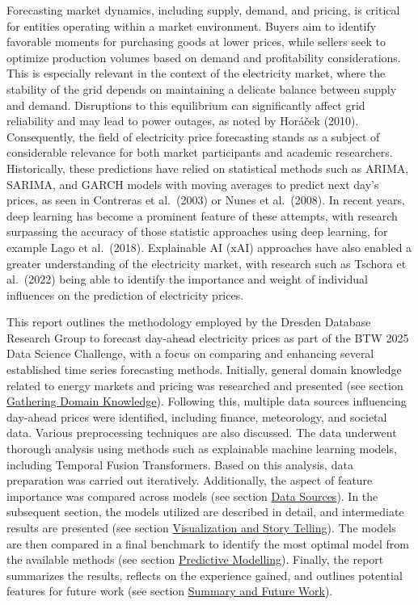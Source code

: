 \documentclass[a4paper]{article}
\begin{document}
    Forecasting market dynamics, including supply, demand, and pricing, is
critical for entities operating within a market environment. Buyers aim
to identify favorable moments for purchasing goods at lower prices,
while sellers seek to optimize production volumes based on demand and
profitability considerations. This is especially relevant in the context
of the electricity market, where the stability of the grid depends on
maintaining a delicate balance between supply and demand. Disruptions to
this equilibrium can significantly affect grid reliability and may lead
to power outages, as noted by Horáček (2010). Consequently, the field of
electricity price forecasting stands as a subject of considerable
relevance for both market participants and academic researchers.
Historically, these predictions have relied on statistical methods such
as ARIMA, SARIMA, and GARCH models with moving averages to predict next
day's prices, as seen in Contreras et al.~(2003) or Nunes et al.~(2008).
In recent years, deep learning has become a prominent feature of these
attempts, with research surpassing the accuracy of those statistic
approaches using deep learning, for example Lago et al.~(2018).
Explainable AI (xAI) approaches have also enabled a greater
understanding of the electricity market, with research such as Tschora
et al.~(2022) being able to identify the importance and weight of
individual influences on the prediction of electricity prices.

This report outlines the methodology employed by the Dresden Database
Research Group to forecast day-ahead electricity prices as part of the
BTW 2025 Data Science Challenge, with a focus on comparing and enhancing
several established time series forecasting methods. Initially, general
domain knowledge related to energy markets and pricing was researched
and presented (see section
\hyperref[gathering-domain-knowledge]{Gathering Domain Knowledge}).
Following this, multiple data sources influencing day-ahead prices were
identified, including finance, meteorology, and societal data. Various
preprocessing techniques are also discussed. The data underwent thorough
analysis using methods such as explainable machine learning models,
including Temporal Fusion Transformers. Based on this analysis, data
preparation was carried out iteratively. Additionally, the aspect of
feature importance was compared across models (see section
\hyperref[data-sources]{Data Sources}). In the subsequent section, the
models utilized are described in detail, and intermediate results are
presented (see section
\hyperref[visualization-and-story-telling]{Visualization and Story Telling}).
The models are then compared in a final benchmark to identify the most
optimal model from the available methods (see section
\hyperref[predictive-modeling]{Predictive Modelling}). Finally, the
report summarizes the results, reflects on the experience gained, and
outlines potential features for future work (see section
\hyperref[summary-and-future-work]{Summary and Future Work}).
\end{document}
